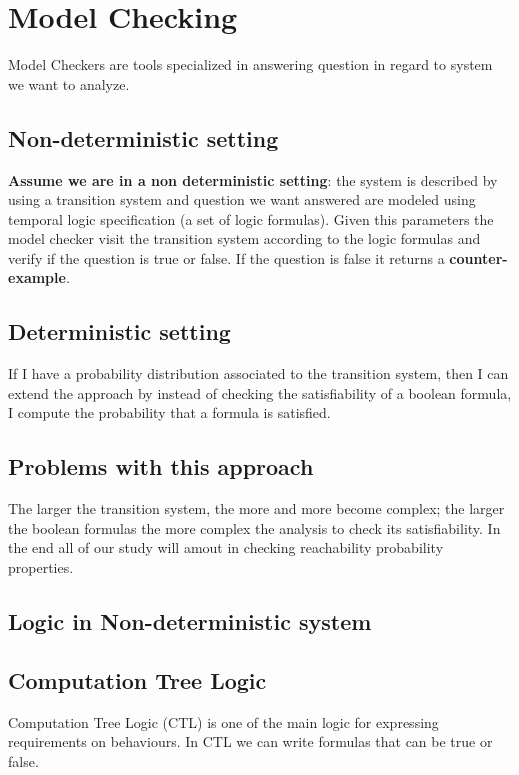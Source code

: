 \chapter{Model Checking}
Model Checkers are tools specialized in answering question in regard to system we want to analyze. \par

\section{Non-deterministic setting}
\textbf{Assume we are in a non deterministic setting}: the system is described by using a transition system and question we want answered are modeled using temporal logic specification (a set of logic formulas). Given this parameters the model checker visit the transition system according to the logic formulas and verify if the question is true or false. If the question is false it returns a \textbf{counter-example}.

\section{Deterministic setting}
If I have a probability distribution associated to the transition system, then I can extend the approach by instead of checking the satisfiability of a boolean formula, I compute the probability that a formula is satisfied.

\section{Problems with this approach}
The larger the transition system, the more and more become complex; the larger the boolean formulas the more complex the analysis to check its satisfiability. In the end all of our study will amout in checking reachability probability properties.

\section{Logic in Non-deterministic system}

\section{Computation Tree Logic}
Computation Tree Logic (CTL) is one of the main logic for expressing requirements on behaviours. In CTL we can write formulas that can be true or false. 

